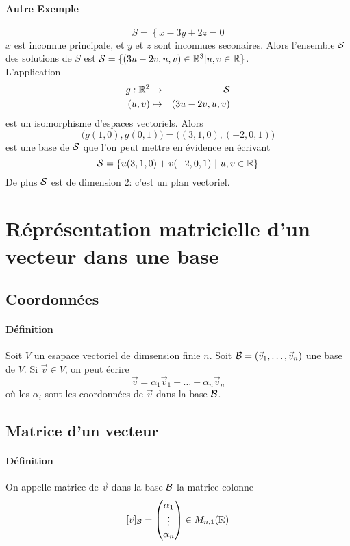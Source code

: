 \paragraph{Autre Exemple}
$$S = \left\{ x - 3y + 2z = 0 \right.$$
$x$ est inconnue principale, et $y$ et $z$ sont inconnues seconaires. Alors l'ensemble $\mathcal{S}$ des solutions de $S$ est $\mathcal{S} = \{(3u - 2v, u, v) \in \mathbb{R}^3 \vert u, v \in \mathbb{R} \}$. \\
L'application 
\begin{eqnarray*}  
  g: \mathbb{R}^2 &\rightarrow& \mathcal{S} \\
    (u, v) & \mapsto & (3u - 2v, u, v)
\end{eqnarray*}
est un isomorphisme d'espaces vectoriels. Alors 
$$\big(g(1, 0), g(0, 1)\big) = \big( (3, 1, 0), (-2, 0, 1) \big)$$ 
est une base de $\mathcal{S}$ que l'on peut mettre en évidence en écrivant
$$\mathcal{S} = \left\{ u(3, 1, 0) + v(-2, 0, 1) ~ \vert ~ u, v \in \mathbb{R} \right\}$$
De plus $\mathcal{S}$ est de dimension $2$: c'est un plan vectoriel.
  
%
%
\section{Réprésentation matricielle d'un vecteur dans une base}
%
%

%
\subsection{Coordonnées}
%
\paragraph{Définition} Soit $V$ un esapace vectoriel de dimsension finie $n$. Soit $\mathcal{B} = (\vec{v}_1, \ldots, \vec{v}_n)$ une base de $V$. Si $\vec{v} \in V$, on peut écrire 
$$\vec{v} = \alpha_1 \vec{v}_1 + \ldots + \alpha_n \vec{v}_n$$
où les $\alpha_i$ sont les coordonnées de $\vec{v}$ dans la base $\mathcal{B}$.

%
\subsection{Matrice d'un vecteur}
%
\paragraph{Définition} On appelle  matrice de $\vec{v}$ dans la base $\mathcal{B}$ la matrice colonne 
$$[\vec{v}]_{\mathcal{B}} = 
\begin{pmatrix} 
  \alpha_1 \\ 
  \vdots \\ 
  \alpha_n 
\end{pmatrix} 
\in M_{n, 1}(\mathbb{R})$$

